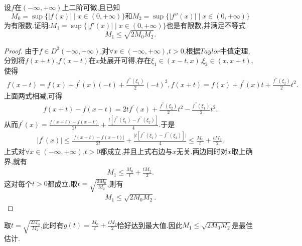 \documentclass[lang=cn,newtx,10pt,scheme=chinese]{../Template/elegantbook}
\begin{document}
\begin{example}\label{example:1.1(由原函数和二阶导数上确界估计一阶导数上确界)(区间为R)}
    设\(f\)在\((-\infty,+\infty)\)上二阶可微,且已知
    \begin{equation}
    M_0=\sup\{\vert f(x)\vert\mid x\in(0,+\infty)\}\text{和}M_2=\sup\{\vert f''(x)\vert\mid x\in(0,+\infty)\}
        \nonumber
    \end{equation}
    为有限数.证明:\(M_1=\sup\{\vert f'(x)\vert\mid x\in(0,+\infty)\}\)也是有限数,并满足不等式
    \begin{equation}
        M_1\leq\sqrt{2M_0M_2}.
        \nonumber
    \end{equation}
\end{example}
\begin{proof}
    由于\(f\in D^2(-\infty,+\infty)\),对\(\forall x\in (-\infty,+\infty)\),\(t > 0\),根据\(Taylor\)中值定理,分别将\(f(x + t)\),\(f(x - t)\)在\(x\)处展开可得,存在\(\xi_1\in (x - t,x)\),\(\xi_2\in (x,x + t)\),使得
    \begin{align*}
    f(x - t) = f(x) + f^{\prime}(x)(-t) + \frac{f^{\prime\prime}(\xi_1)}{2}(-t)^2,
f(x + t) = f(x) + f^{\prime}(x)t + \frac{f^{\prime\prime}(\xi_2)}{2}t^2.
    \end{align*}
上面两式相减,可得
\begin{align*}
   f(x + t) - f(x - t) = 2tf^{\prime}(x) + \frac{f^{\prime\prime}(\xi_2)}{2}t^2 - \frac{f^{\prime\prime}(\xi_1)}{2}t^2.
\end{align*}
从而\(f^{\prime}(x) = \frac{f(x + t) - f(x - t)}{2t} + \frac{t[f^{\prime\prime}(\xi_1) - f^{\prime\prime}(\xi_2)]}{4}\).于是
\begin{align*}
    \vert f^{\prime}(x)\vert\leqslant \frac{\vert f(x + t) - f(x - t)\vert}{2t} + \frac{\vert t[f^{\prime\prime}(\xi_1) - f^{\prime\prime}(\xi_2)]\vert}{4}\leqslant \frac{M_0}{t} + \frac{tM_2}{2}.
\end{align*}
上式对\(\forall x\in (-\infty,+\infty)\),\(t > 0\)都成立,并且上式右边与\(x\)无关.两边同时对\(x\)取上确界,就有
\begin{align*}
    M_1\leqslant \frac{M_0}{t} + \frac{tM_2}{2}.
\end{align*}
这对每个\(t > 0\)都成立.取\(t = \sqrt{\frac{2M_0}{M_2}}\),则有
\begin{align*}
    M_1\leqslant \sqrt{2M_0M_2}.
\end{align*} 
\end{proof}
\begin{remark}
    取\(t = \sqrt{\frac{2M_0}{M_2}}\),此时有\(g(t) = \frac{M_0}{t} + \frac{tM_2}{2}\)恰好达到最大值.因此\(M_1\leqslant \sqrt{2M_0M_2}\)是最佳估计.
\end{remark}
\end{document}
